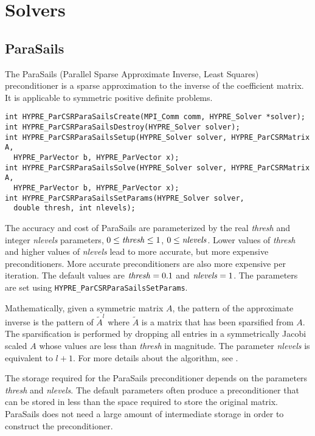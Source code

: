 \chapter{Solvers}

\section{ParaSails}

The ParaSails (Parallel Sparse Approximate Inverse, Least Squares) 
preconditioner is a sparse approximation to the inverse of the 
coefficient matrix.  It is applicable to symmetric positive definite
problems.  

\begin{display}
\begin{verbatim}
int HYPRE_ParCSRParaSailsCreate(MPI_Comm comm, HYPRE_Solver *solver);
int HYPRE_ParCSRParaSailsDestroy(HYPRE_Solver solver);
int HYPRE_ParCSRParaSailsSetup(HYPRE_Solver solver, HYPRE_ParCSRMatrix A,
  HYPRE_ParVector b, HYPRE_ParVector x);
int HYPRE_ParCSRParaSailsSolve(HYPRE_Solver solver, HYPRE_ParCSRMatrix A,
  HYPRE_ParVector b, HYPRE_ParVector x);
int HYPRE_ParCSRParaSailsSetParams(HYPRE_Solver solver, 
  double thresh, int nlevels);
\end{verbatim}
\end{display}

The accuracy and cost of ParaSails are parameterized by the real {\em thresh}
and integer {\em nlevels} parameters, 
$0 \le {\it thresh} \le 1$, $0 \le {\it nlevels}$.  
Lower values of {\em thresh}
and higher values of {\em nlevels} lead to more accurate, but more expensive
preconditioners.  More accurate preconditioners are also more expensive
per iteration.  The default values are ${\it thresh} = 0.1$
and ${\it nlevels} = 1$.  The parameters are set using 
{\tt HYPRE\_ParCSRParaSailsSetParams}.

Mathematically, given a symmetric matrix $A$, the pattern of the 
approximate inverse is the pattern of $\tilde{A}^l$ where $\tilde{A}$
is a matrix that has been sparsified from $A$.  The sparsification 
is performed by dropping all entries in a symmetrically Jacobi scaled $A$
whose values are less than {\em thresh} in magnitude.  The parameter
{\em nlevels} is equivalent to $l+1$.
For more details about the algorithm, see \cite{Chow:1999:APS}.

The storage required for the ParaSails preconditioner depends on 
the parameters {\em thresh} and {\em nlevels}.  The default parameters
often produce a preconditioner that can be stored in less than the 
space required to store the original matrix.
ParaSails does not need a large amount of intermediate storage in 
order to construct the preconditioner.

